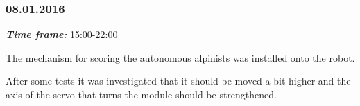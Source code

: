 \subsubsection{08.01.2016}
\textit{\textbf{Time frame:}} 15:00-22:00 

The mechanism for scoring the autonomous alpinists was installed onto the robot. 

After some tests it was investigated that it should be moved a bit higher and the axis of the servo that turns the module should be strengthened.
